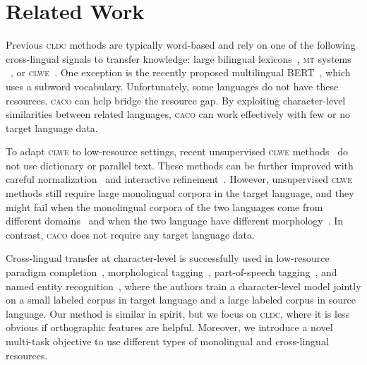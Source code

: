 \documentclass[letterpaper]{article} %
\newcommand{\citep}{\cite}
\newcommand{\abr}[1]{\textsc{#1}}
\newcommand{\name}[0]{\textsc{caco}}
\begin{document}
\section{Related Work}\label{sec:related}

Previous \abr{cldc} methods are typically word-based and rely on one of the
following cross-lingual signals to transfer knowledge: large bilingual
lexicons~\citep{shi-10,andrade-15}, \abr{mt} systems
~\citep{banea-08-fixed,wan-09-fixed,zhou-16}, or
\abr{clwe}~\citep{klementiev-12}.
One exception is the recently proposed multilingual
BERT~\citep{devlin-19,wu-19}, which uses a subword vocabulary.
Unfortunately, some languages do not have these resources.
\name{} can help bridge the resource gap.
By exploiting character-level similarities between related languages, \name{}
can work effectively with few or no target language data.

To adapt \abr{clwe} to low-resource settings, recent unsupervised \abr{clwe}
methods~\citep{conneau-18,artetxe-18b} do not use dictionary or parallel text.
These methods can be further improved with careful
normalization~\citep{zhang-19} and interactive refinement~\citep{yuan-19}.
However, unsupervised \abr{clwe} methods still require large monolingual
corpora in the target language, and they might fail when the monolingual corpora
of the two languages come from different domains~\citep{sogaard-18,fujinuma-19}
and when the two language have different morphology~\citep{czarnowska-19}.
In contrast, \name{} does not require any target language data.

Cross-lingual transfer at character-level is successfully used in low-resource
paradigm completion~\citep{kann-17}, morphological
tagging~\citep{cotterell-17a}, part-of-speech tagging~\citep{kim-17}, and named
entity recognition~\citep{bharadwaj-16,cotterell-17b,lin-18,rijhwani-19}, where
the authors train a character-level model jointly on a small labeled corpus in
target language and a large labeled corpus in source language.
Our method is similar in spirit, but we focus on \abr{cldc}, where it is less
obvious if orthographic features are helpful.
Moreover, we introduce a novel multi-task objective to use different types of
monolingual and cross-lingual resources.
\end{document}
